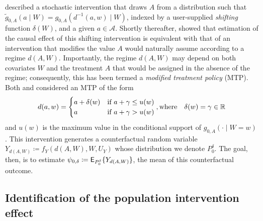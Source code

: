 \citet{diaz2012population} described a stochastic intervention that draws $A$
from a distribution such that $\tilde{g}_{0,A}(a \mid W) = g_{0,A}(d^{-1}(a, w)
\mid W)$, indexed by a user-supplied \textit{shifting} function $\delta(W)$, and
a given $a \in \mathcal{A}$. Shortly thereafter, \citet{haneuse2013estimation}
showed that estimation of the causal effect of this shifting intervention is
equivalent with that of an intervention that modifies the value $A$ would
naturally assume according to a regime $d(A,W)$. Importantly, the regime
$d(A,W)$ may depend on both covariates $W$ and the treatment $A$ that would be
assigned in the absence of the regime; consequently, this has been termed
a \textit{modified treatment policy} (MTP). Both \citet{haneuse2013estimation}
and \citet{diaz2018stochastic} considered an MTP of the form
\begin{equation}\label{eqn:defn_shift}
  d(a, w) =
  \begin{cases}
    a + \delta(w) & \text{if } a + \gamma \leq u(w) \\
    a & \text{if } a + \gamma > u(w)
  \end{cases},
  \text{where} \quad \delta(w) = \gamma \in \mathbb{R}
\end{equation}
and $u(w)$ is the maximum value in the conditional support of $g_{0,A}(\cdot
\mid W = w)$. This intervention generates a counterfactual random variable
$Y_{d(A, W)} \coloneqq f_Y(d(A, W), W, U_Y)$ whose distribution we denote
$P_0^{\delta}$. The goal, then, is to estimate $\psi_{0, \delta} \coloneqq
\mathsf{E}_{P_0^{\delta}} \{ Y_{d(A, W)} \}$, the mean of this counterfactual outcome.

\subsection{Identification of the population intervention
  effect}\label{pie_param}

